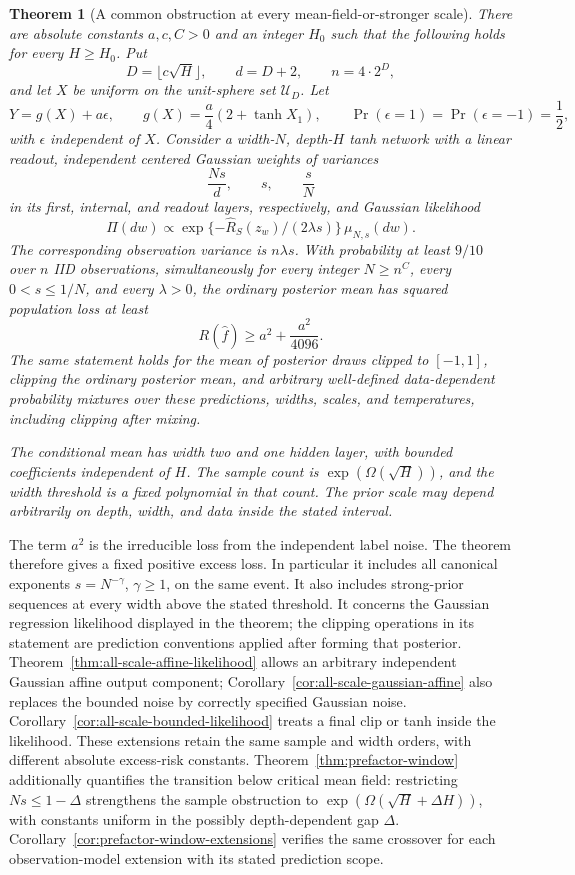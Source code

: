 \documentclass[11pt]{article}
\newtheorem{theorem}{Theorem}[section]\newtheorem{lemma}[theorem]{Lemma}\newtheorem{corollary}[theorem]{Corollary}\newtheorem{proposition}[theorem]{Proposition}
\begin{document}
\begin{theorem}[A common obstruction at every mean-field-or-stronger scale]
\label{thm:all-scale-learning}
There are absolute constants $a,c,C>0$ and an integer $H_0$ such that the following holds for every $H\ge H_0$. Put
\[
 D=\lfloor c\sqrt H\rfloor,\qquad d=D+2,\qquad n=4\cdot2^D,
\]
and let $X$ be uniform on the unit-sphere set $\mathcal U_D$. Let
\[
 Y=g(X)+a\epsilon,\qquad
 g(X)=\frac a4(2+\tanh X_1),\qquad
 \Pr(\epsilon=1)=\Pr(\epsilon=-1)=\frac12,
\]
with $\epsilon$ independent of $X$. Consider a width-$N$, depth-$H$ tanh network with a linear readout, independent centered Gaussian weights of variances
\[
 \frac{Ns}{d},\qquad s,\qquad\frac sN
\]
in its first, internal, and readout layers, respectively, and Gaussian likelihood
\[
 \Pi(dw)\propto\exp\{-\widehat R_S(z_w)/(2\lambda s)\}\,\mu_{N,s}(dw).
\]
The corresponding observation variance is $n\lambda s$. With probability at least $9/10$ over $n$ IID observations, simultaneously for every integer $N\ge n^C$, every $0<s\le1/N$, and every $\lambda>0$, the ordinary posterior mean has squared population loss at least
\[
 R(\widehat f)\ge a^2+\frac{a^2}{4096}.
\]
The same statement holds for the mean of posterior draws clipped to $[-1,1]$, clipping the ordinary posterior mean, and arbitrary well-defined data-dependent probability mixtures over these predictions, widths, scales, and temperatures, including clipping after mixing.

The conditional mean has width two and one hidden layer, with bounded coefficients independent of $H$. The sample count is $\exp(\Omega(\sqrt H))$, and the width threshold is a fixed polynomial in that count. The prior scale may depend arbitrarily on depth, width, and data inside the stated interval.
\end{theorem}

The term $a^2$ is the irreducible loss from the independent label noise. The theorem therefore gives a fixed positive excess loss. In particular it includes all canonical exponents $s=N^{-\gamma}$, $\gamma\ge1$, on the same event. It also includes strong-prior sequences at every width above the stated threshold. It concerns the Gaussian regression likelihood displayed in the theorem; the clipping operations in its statement are prediction conventions applied after forming that posterior. Theorem~\ref{thm:all-scale-affine-likelihood} allows an arbitrary independent Gaussian affine output component; Corollary~\ref{cor:all-scale-gaussian-affine} also replaces the bounded noise by correctly specified Gaussian noise. Corollary~\ref{cor:all-scale-bounded-likelihood} treats a final clip or tanh inside the likelihood. These extensions retain the same sample and width orders, with different absolute excess-risk constants. Theorem~\ref{thm:prefactor-window} additionally quantifies the transition below critical mean field: restricting $Ns\le1-\Delta$ strengthens the sample obstruction to $\exp(\Omega(\sqrt H+\Delta H))$, with constants uniform in the possibly depth-dependent gap $\Delta$. Corollary~\ref{cor:prefactor-window-extensions} verifies the same crossover for each observation-model extension with its stated prediction scope.
\end{document}

